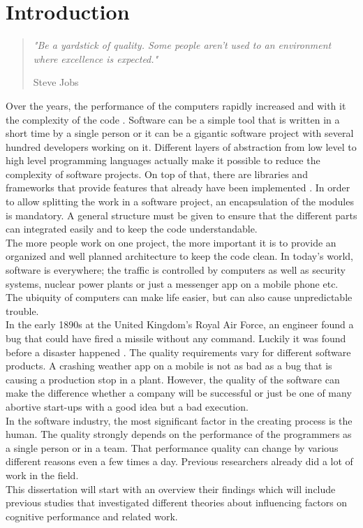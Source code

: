 \chapter{Introduction}

\begin{quote}
\centering 
\em %
"Be a yardstick of quality. Some people aren't used to an environment where excellence is expected."

\medskip
\raggedleft
Steve Jobs
\end{quote}
\vspace{10 mm}

Over the years, the performance of the computers rapidly increased and with it the complexity of the code \cite{wirth2008brief}.
Software can be a simple tool that is written in a short time by a single person or it can be a gigantic software project with several hundred developers working on it\cite{cusumano1997microsoft}.
Different layers of abstraction from low level to high level programming languages actually make it possible to reduce the complexity of software projects. On top of that, there are libraries and frameworks that provide features that already have been implemented \cite{Martin:2008:CCH:1388398}.
In order to allow splitting the work in a software project, an encapsulation of the modules is mandatory. A general structure must be given to ensure that the different parts can integrated easily and to keep the code understandable.\\
The more people work on one project, the more important it is to provide an organized and well planned architecture to keep the code clean.
\bigbreak
In today's world, software is everywhere; the traffic is controlled by computers as well as security systems, nuclear power plants or just a messenger app on a mobile phone etc. \\
The ubiquity of computers can make life easier, but can also cause unpredictable trouble.\\
In the early 1890s at the United Kingdom's Royal Air Force, an engineer found a bug that could have fired a missile without any command. Luckily it was found before a disaster happened \cite{ross2005exterminators}.
\bigbreak
The quality requirements vary for different software products. A crashing weather app on a mobile is not as bad as a bug that is causing a production stop in a plant. 
However, the quality of the software can make the difference whether a company will be successful or just be one of many abortive start-ups with a good idea but a bad execution.
\\
In the software industry, the most significant factor in the creating process is the human. The quality strongly depends on the performance of the programmers as a single person or in a team. That performance quality can change by various different reasons even a few times a day.
\bigbreak 
Previous researchers already did a lot of work in the field. \\
This dissertation will start with an overview their findings which will include previous studies that investigated different theories about influencing factors on cognitive performance and related work.

